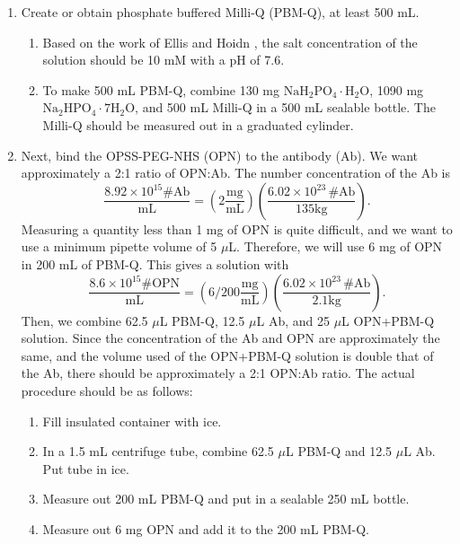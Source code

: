 \begin{enumerate}
\item Create or obtain phosphate buffered Milli-Q (PBM-Q), at least 500 mL.

\begin{enumerate}
\item Based on the work of Ellis and Hoidn \citep{hoidnellis}, the salt concentration of the solution should be 10 mM with a pH of 7.6.

\item To make 500 mL PBM-Q, combine 130 mg $\mathrm{NaH_2PO_4\cdot H_2O}$, 1090 mg $\mathrm{Na_2HPO_4\cdot7H_2O}$, and 500 mL Milli-Q in a 500 mL sealable bottle. The Milli-Q should be measured out in a graduated cylinder.

\end{enumerate}

\item Next, bind the OPSS-PEG-NHS (OPN) to the antibody (Ab). We want approximately a 2:1 ratio of OPN:Ab. The number concentration of the Ab is \[\frac{8.92\times10^{15}\#\mathrm{Ab}}{\mathrm{mL}}=\left(2\mathrm{\frac{mg}{mL}}\right)\left(\frac{6.02\times10^{23}\,\#\mathrm{Ab}}{135 \mathrm{kg}}\right).\]
Measuring a quantity less than 1 mg of OPN is quite difficult, and we want to use a minimum pipette volume of 5 $\mu$L. Therefore, we will use 6 mg of OPN in 200 mL of PBM-Q. This gives a solution with
\[\frac{8.6\times10^{15}\#\mathrm{OPN}}{\mathrm{mL}}=\left(6/200\mathrm{\frac{mg}{mL}}\right)\left(\frac{6.02\times10^{23}\,\#\mathrm{Ab}}{2.1 \mathrm{kg}}\right).\]
Then, we combine 62.5 $\mu$L PBM-Q, 12.5 $\mu$L Ab, and 25 $\mu$L OPN+PBM-Q solution. Since the concentration of the Ab and OPN are approximately the same, and the volume used of the OPN+PBM-Q solution is double that of the Ab, there should be approximately a 2:1 OPN:Ab ratio. The actual procedure should be as follows:

\begin{enumerate}
\item Fill insulated container with ice.

\item In a 1.5 mL centrifuge tube, combine 62.5 $\mu$L PBM-Q and 12.5 $\mu$L Ab. Put tube in ice.

\item Measure out 200 mL PBM-Q and put in a sealable 250 mL bottle.

\item Measure out 6 mg OPN and add it to the 200 mL PBM-Q.


\end{enumerate}
\end{enumerate}
